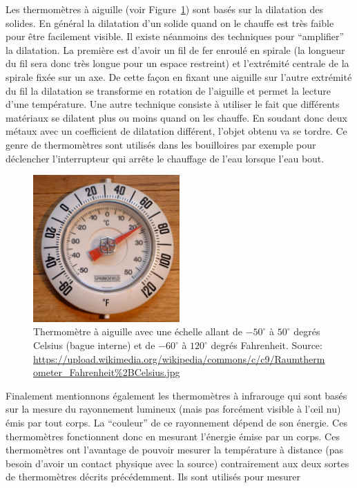 \documentclass[a4paper,12pt]{book}
\begin{document}
Les thermomètres à aiguille (voir Figure~\ref{fig_thermo_aiguille}) sont basés sur la dilatation des solides. 
En général la dilatation d'un solide quand on le chauffe est très faible pour être facilement
visible. Il existe néanmoins des techniques pour ``amplifier'' la dilatation. La première est d'avoir un fil de fer enroulé en spirale 
(la longueur du fil sera donc très longue pour un espace restreint) et l'extrémité centrale de la spirale
fixée sur un axe. De cette façon en fixant une aiguille sur l'autre extrémité du fil la dilatation se transforme en rotation de 
l'aiguille et permet la lecture d'une température. Une autre technique consiste à utiliser le fait que différents matériaux 
se dilatent plus ou moins quand on les chauffe. En soudant donc deux métaux avec un coefficient de dilatation différent, 
l'objet obtenu va se tordre. Ce genre de thermomètres sont utilisés dans les bouilloires par exemple pour déclencher 
l'interrupteur qui arrête le chauffage de l'eau lorsque l'eau bout.
\begin{figure}
\begin{center}
\includegraphics[width=0.5\textwidth]{figs/thermo_c_f.jpg}
\caption{Thermomètre à aiguille avec une échelle allant de $-50^\circ$ à $50^\circ$ degrés Celsius (bague interne) et de $-60^\circ$ à $120^\circ$ 
degrés Fahrenheit. Source: \url{https://upload.wikimedia.org/wikipedia/commons/c/c9/Raumthermometer_Fahrenheit\%2BCelsius.jpg}}
\label{fig_thermo_aiguille}
\end{center}
\end{figure} 
Finalement mentionnons également les thermomètres à infrarouge qui sont basés sur la mesure du rayonnement lumineux (mais pas forcément visible à l’œil nu)
émis par tout corps. La ``couleur'' de ce rayonnement dépend de son énergie. Ces thermomètres fonctionnent donc en mesurant 
l'énergie émise par un corps. Ces thermomètres ont l'avantage de pouvoir mesurer la température à distance (pas besoin d'avoir un contact physique avec la source) contrairement aux deux sortes de thermomètres décrits précédemment. Ils sont utilisés pour mesurer
\end{document}
